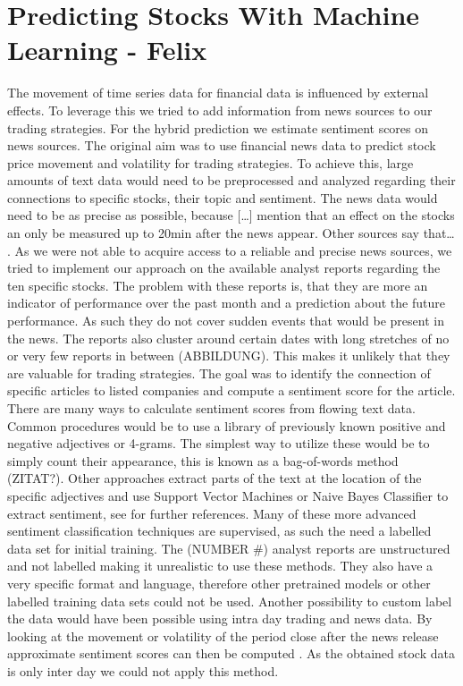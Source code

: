 \chapter{Predicting Stocks With Machine Learning - Felix} \label{ch:predictions_ml}
The movement of time series data for financial data is influenced by external effects. To leverage this we tried to add information from news sources to our trading strategies. For the hybrid prediction we estimate sentiment scores on news sources. The original aim was to use financial news data to predict stock price movement and volatility for trading strategies. To achieve this, large amounts of text data would need to be preprocessed and analyzed regarding their connections to specific stocks, their topic and sentiment. The news data would need to be as precise as possible, because […] mention that an effect on the stocks an only be measured up to 20min after the news appear. Other sources say that… .
%
As we were not able to acquire access to a reliable and precise news sources, we tried to implement our approach on the available analyst reports regarding the ten specific stocks. The problem with these reports is, that they are more an indicator of performance over the past month and a prediction about the future performance. As such they do not cover sudden events that would be present in the news. The reports also cluster around certain dates with long stretches of no or very few reports in between (ABBILDUNG). This makes it unlikely that they are valuable for trading strategies.
%
The goal was to identify the connection of specific articles to listed companies and compute a sentiment score for the article. There are many ways to calculate sentiment scores from flowing text data. Common procedures would be to use a library of previously known positive and negative adjectives or 4-grams. The simplest way to utilize these would be to simply count their appearance, this is known as a bag-of-words method (ZITAT?). Other approaches extract parts of the text at the location of the specific adjectives and use Support Vector Machines or Naive Bayes Classifier to extract sentiment, see \citet{westerski2007sentiment} for further references. Many of these more advanced sentiment classification techniques are supervised, as such the need a labelled data set for initial training. The (NUMBER #) analyst reports are unstructured and not labelled making it unrealistic to use these methods. They also have a very specific format and language, therefore other pretrained models or other labelled training data sets could not be used. Another possibility to custom label the data would have been possible using intra day trading and news data. By looking at the movement or volatility of the period close after the news release approximate sentiment scores can then be computed \citep{robertson2007news}. As the obtained stock data is only inter day we could not apply this method.


